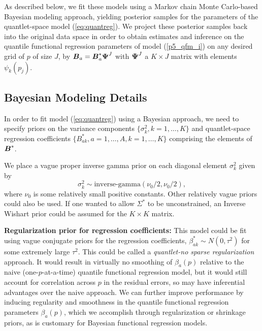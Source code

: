 \documentclass[11pt]{article}
\newcommand{\bB}{\mbox{\boldmath $B$}}
\newcommand{\bPsi}{\mbox{\boldmath $\Psi$}}
\begin{document}
As described below, we fit these models using a Markov chain Monte Carlo-based Bayesian modeling approach, yielding posterior samples for the parameters of the quantlet-space model (\ref{eq:quantreg}).  We project these posterior samples back into the original data space in order to obtain estimates and inference on the quantile functional regression parameters of model (\ref{p5_qfm_i}) on any desired grid of $p$ of size $J$, by $\bB_a=\bB^*_a \bPsi^J$ with $\bPsi^J$ a $K \times J$ matrix with elements $\psi_k(p_j)$.



\subsection{ {\bf Bayesian Modeling Details}}

In order to fit model (\ref{eq:quantreg}) using a Bayesian approach, we need to specify priors on the variance components $\{\sigma^2_k, k=1,\ldots,K\}$ and quantlet-space regression coefficients $\{B^*_{ak}, a=1,\ldots, A, k=1,\ldots,K\}$ comprising the elements of $\bB^*$.

We place a vague proper inverse gamma prior on each diagonal element $\sigma_{k}^2$ given by
    \begin{equation}    \label{p5_prior_G} 
      \sigma_{k}^2 \sim \text{inverse-gamma}( \nu_0/2,  \nu_0/2 ),
  \end{equation}
where $\nu_0$ is some relatively small positive constants. Other relatively vague priors could also be used. 
If one wanted to allow $\Sigma^*$ to be unconstrained, an Inverse Wishart prior could be assumed for the $K \times K$ matrix.

\textbf{Regularization prior for regression coefficients:}  
This model could be fit using vague conjugate priors for the regression coefficients, $\beta^*_{ak} \sim N(0, \tau^2)$ for some extremely large $\tau^2$.  This could be called a \textit{quantlet-no sparse regularization} approach.  It would result in virtually no smoothing of $\beta_a(p)$ relative to the naive (one-$p$-at-a-time) quantile functional regression model, but it would still account for correlation across $p$ in the residual errors, so may have inferential advantages over the naive approach.   We can further improve performance by inducing regularity and smoothness in the quantile functional regression parameters $\beta_a(p)$, which we accomplish through regularization or shrinkage priors, as is customary for Bayesian functional regression models.
\end{document}
